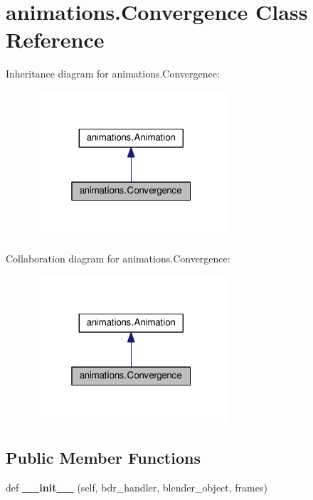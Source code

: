 \hypertarget{classanimations_1_1Convergence}{}\section{animations.\+Convergence Class Reference}
\label{classanimations_1_1Convergence}


Inheritance diagram for animations.\+Convergence\+:\nopagebreak
\begin{figure}[H]
\begin{center}
\leavevmode
\includegraphics[width=205pt]{classanimations_1_1Convergence__inherit__graph}
\end{center}
\end{figure}


Collaboration diagram for animations.\+Convergence\+:\nopagebreak
\begin{figure}[H]
\begin{center}
\leavevmode
\includegraphics[width=205pt]{classanimations_1_1Convergence__coll__graph}
\end{center}
\end{figure}
\subsection*{Public Member Functions}
\begin{DoxyCompactItemize}
\item 
def {\bfseries \+\_\+\+\_\+init\+\_\+\+\_\+} (self, bdr\+\_\+handler, blender\+\_\+object, frames)\hypertarget{classanimations_1_1Convergence_a33c1c9719ce9ac7a75d3037b452927b3}{}\label{classanimations_1_1Convergence_a33c1c9719ce9ac7a75d3037b452927b3}

\end{DoxyCompactItemize}
